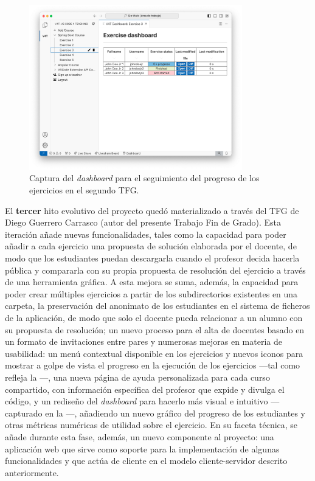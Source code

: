 \begin{figure}[ht!]
    \centering
    \includegraphics[width=0.825\textwidth]{imagenes/utilizadas/1-introduccion/historia-tfg2-dashboard.png}
    \caption{Captura del \textit{dashboard} para el seguimiento del progreso de los ejercicios en el segundo TFG.}
    \label{fig:historiaProyecto2Dashboard}
\end{figure}

El \textbf{tercer} hito evolutivo del proyecto quedó materializado a través del TFG de Diego Guerrero Carrasco \cite{TFG_Diego1} (autor del presente Trabajo Fin de Grado). Esta iteración añade nuevas funcionalidades, tales como la capacidad para poder añadir a cada ejercicio una propuesta de solución elaborada por el docente, de modo que los estudiantes puedan descargarla cuando el profesor decida hacerla pública y compararla con su propia propuesta de resolución del ejercicio a través de una herramienta gráfica. A esta mejora se suma, además, la capacidad para poder crear múltiples ejercicios a partir de los subdirectorios existentes en una carpeta, la preservación del anonimato de los estudiantes en el sistema de ficheros de la aplicación, de modo que solo el docente pueda relacionar a un alumno con su propuesta de resolución; un nuevo proceso para el alta de docentes basado en un formato de invitaciones entre pares y numerosas mejoras en materia de usabilidad: un menú contextual disponible en los ejercicios y nuevos iconos para mostrar a golpe de vista el progreso en la ejecución de los ejercicios ---tal como refleja la ---, una nueva página de ayuda personalizada para cada curso compartido, con información específica del profesor que expide y divulga el código, y un rediseño del \textit{dashboard} para hacerlo más visual e intuitivo ---capturado en la ---, añadiendo un nuevo gráfico del progreso de los estudiantes y otras métricas numéricas de utilidad sobre el ejercicio. En su faceta técnica, se añade durante esta fase, además, un nuevo componente al proyecto: una aplicación web que sirve como soporte para la implementación de algunas funcionalidades y que actúa de cliente en el modelo cliente-servidor descrito anteriormente.

